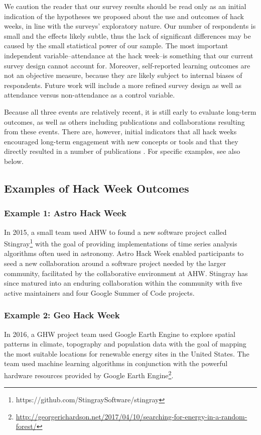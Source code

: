 We caution the reader that our survey results should be read only as an initial indication of the hypotheses we proposed about the use and outcomes of hack weeks, in line with the surveys' exploratory nature. Our number of respondents is small and the effects likely subtle, thus the lack of significant differences may be caused by the small statistical power of our sample. The most important independent variable--attendance at the hack week--is something that our current survey design cannot account for. Moreover, self-reported learning outcomes are not an objective measure, because they are likely subject to internal biases of respondents. Future work will include a more refined survey design as well as attendance versus non-attendance as a control variable. 

Because all three events are relatively recent, it is still early to evaluate long-term outcomes, as well as others including publications and collaborations resulting from these events.
There are, however, initial indicators that all hack weeks encouraged long-term engagement with new concepts or tools and that they directly resulted in a number of publications \cite{gullysantiago2015,faria2016,keshavan2017,leonard2017,jordan2017,peterson2017,hahn2017,pricewhelan2017}. For specific examples, see also below.

\subsection*{Examples of Hack Week Outcomes}
\label{sec:outcomes}
\subsubsection*{Example 1: Astro Hack Week}
In 2015, a small team used AHW to found a new software project called Stingray\footnote{https://github.com/StingraySoftware/stingray} with the goal of providing implementations of time series analysis algorithms often used in astronomy.
Astro Hack Week enabled participants to seed a new collaboration around a software project needed by the larger community, facilitated by the collaborative environment at AHW.
Stingray has since matured into an enduring collaboration within the community with five active maintainers and four Google Summer of Code projects.
\subsubsection*{Example 2: Geo Hack Week}
In 2016, a GHW project team used Google Earth Engine to explore spatial patterns in climate, topography and population data with the goal of mapping the most suitable locations for renewable energy sites in the United States.
The team used machine learning algorithms in conjunction with the powerful hardware resources provided by Google Earth Engine\footnote{\url{http://georgerichardson.net/2017/04/10/searching-for-energy-in-a-random-forest/}}.
